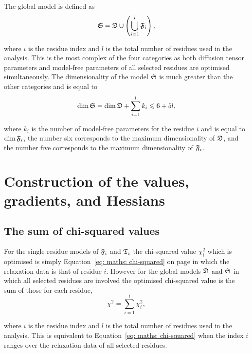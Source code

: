 The global model is defined as
\begin{equation}
    \mathfrak{S} = \mathfrak{D} \cup \left( \bigcup_{i=1}^l \mathfrak{F}_i \right),
\end{equation}

\noindent where $i$ is the residue index and $l$ is the total number of residues used in the analysis.  This is the most complex of the four categories as both diffusion tensor parameters and model-free parameters of all selected residues are optimised simultaneously.  The dimensionality of the model $\mathfrak{S}$ is much greater than the other categories and is equal to
\begin{equation}
    \dim \mathfrak{S} = \dim \mathfrak{D} + \sum_{i=1}^l k_i \leqslant 6 + 5l,
\end{equation}

\noindent where $k_i$ is the number of model-free parameters for the residue $i$ and is equal to $\dim \mathfrak{F}_i$, the number six corresponds to the maximum dimensionality of $\mathfrak{D}$, and the number five corresponds to the maximum dimensionality of $\mathfrak{F}_i$.





\section{Construction of the values, gradients, and Hessians}



\subsection{The sum of chi-squared values}

For the single residue models of $\mathfrak{F}_i$ and $\mathfrak{T}_i$ the chi-squared value $\chi^2_i$ which is optimised is simply Equation~\eqref{eq: maths: chi-squared} on page \pageref{eq: maths: chi-squared} in which the relaxation data is that of residue $i$.  However for the global models $\mathfrak{D}$ and $\mathfrak{S}$ in which all selected residues are involved the optimised chi-squared value is the sum of those for each residue,
\begin{equation}
    \chi^2 = \sum^l_{i=1} \chi^2_i,
\end{equation}

\noindent where $i$ is the residue index and $l$ is the total number of residues used in the analysis.  This is equivalent to Equation~\eqref{eq: maths: chi-squared} when the index $i$ ranges over the relaxation data of all selected residues.



